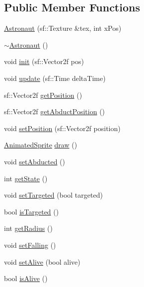 \subsection*{Public Member Functions}
\begin{DoxyCompactItemize}
\item 
\hyperlink{class_astronaut_a13872a765bd37b5df0a12c89df08627b}{Astronaut} (sf\+::\+Texture \&tex, int x\+Pos)
\item 
\hyperlink{class_astronaut_af31f9de205719a042df5f0a1879ee064}{$\sim$\+Astronaut} ()
\item 
void \hyperlink{class_astronaut_a1f21de93b38b191d9641b8b23bcbbacb}{init} (sf\+::\+Vector2f pos)
\item 
void \hyperlink{class_astronaut_a2df268d2fa9a1783fda0c772130cddd2}{update} (sf\+::\+Time delta\+Time)
\item 
sf\+::\+Vector2f \hyperlink{class_astronaut_a3738ff50527c44f089b110ecdb0be2f3}{get\+Position} ()
\item 
sf\+::\+Vector2f \hyperlink{class_astronaut_a7b30fc496f4f8bb28770b05c641222a1}{get\+Abduct\+Position} ()
\item 
void \hyperlink{class_astronaut_a76e03abf8dd510b493c4e079015725d8}{set\+Position} (sf\+::\+Vector2f position)
\item 
\hyperlink{class_animated_sprite}{Animated\+Sprite} \hyperlink{class_astronaut_a0dca06c39c27c2f451de64bbc1785d0a}{draw} ()
\item 
void \hyperlink{class_astronaut_a08c429446d2b203c6f0386bfd4ce746e}{set\+Abducted} ()
\item 
int \hyperlink{class_astronaut_a6396ab5b07039062ab97666d36bb781a}{get\+State} ()
\item 
void \hyperlink{class_astronaut_aad3dde72837f3a51c18cfe70ce881f93}{set\+Targeted} (bool targeted)
\item 
bool \hyperlink{class_astronaut_abf65a970647ce5388dc8488e5fd232d3}{is\+Targeted} ()
\item 
int \hyperlink{class_astronaut_afcf013c7b009a8ef65ab84613eba4000}{get\+Radius} ()
\item 
void \hyperlink{class_astronaut_aca642a5da85bd7546c7750d87ffdad5c}{set\+Falling} ()
\item 
void \hyperlink{class_astronaut_ac969b5ce6219bb260e0c88a8ec57f459}{set\+Alive} (bool alive)
\item 
bool \hyperlink{class_astronaut_aeba104cdac7b5d4bf3be18b890dd0b25}{is\+Alive} ()
\end{DoxyCompactItemize}


